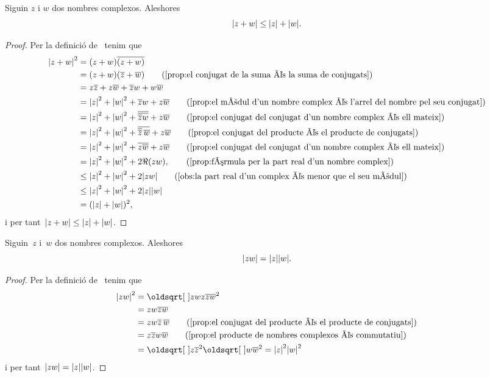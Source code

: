\documentclass[../Apunts.tex]{subfiles}
\begin{document}
	\begin{proposition}
		\label{prop:desigualta triangular nombres complexos}
		Siguin \(z\) i \(w\) dos nombres complexos. Aleshores
		\[\modul{z+w}\leq\modul{z}+\modul{w}.\]
	\end{proposition}
	\begin{proof}
		Per la definició de~ tenim que
		\begin{align*}
			\modul{z+w}^{2}&=(z+w)\conjugat{(z+w)} \\
			&=(z+w)(\conjugat{z}+\conjugat{w}) \tag{\ref{prop:el conjugat de la suma és la suma de conjugats}} \\
			&=z\conjugat{z}+z\conjugat{w}+\conjugat{z}w+w\conjugat{w} \\
			&=\modul{z}^{2}+\modul{w}^{2}+\conjugat{z}w+z\conjugat{w} \tag{\ref{prop:el mòdul d'un nombre complex és l'arrel del nombre pel seu conjugat}} \\
			&=\modul{z}^{2}+\modul{w}^{2}+\conjugat{\conjugat{\conjugat{z}w}}+z\conjugat{w} \tag{\ref{prop:el conjugat del conjugat d'un nombre complex és ell mateix}} \\
			&=\modul{z}^{2}+\modul{w}^{2}+\conjugat{\conjugat{\conjugat{z}}\,\conjugat{w}}+z\conjugat{w} \tag{\ref{prop:el conjugat del producte és el producte de conjugats}} \\
			&=\modul{z}^{2}+\modul{w}^{2}+\conjugat{z\conjugat{w}}+z\conjugat{w}\tag{\ref{prop:el conjugat del conjugat d'un nombre complex és ell mateix}} \\
			&=\modul{z}^{2}+\modul{w}^{2}+2\Re(zw), \tag{\ref{prop:fórmula per la part real d'un nombre complex}} \\
			&\leq\modul{z}^{2}+\modul{w}^{2}+2\modul{zw} \tag{\ref{obs:la part real d'un complex és menor que el seu mòdul}} \\
			&\leq\modul{z}^{2}+\modul{w}^{2}+2\modul{z}\modul{w} \\
			&=(\modul{z}+\modul{w})^{2},
		\end{align*}
		i per tant~\(\modul{z+w}\leq\modul{z}+\modul{w}\).
	\end{proof}
	\begin{proposition}
		\label{prop:el producte de mòduls és el mòdul del producte}
		Siguin~\(z\) i~\(w\) dos nombres complexos. Aleshores
		\[\modul{zw}=\modul{z}\modul{w}.\]
	\end{proposition}
	\begin{proof}
		Per la definició de~ tenim que
		\begin{align*}
			\modul{zw}^{2}&=\sqrt{zwz\conjugat{zw}}^{2} \\
			&=zw\conjugat{zw} \\
			&=zw\conjugat{z}\,\conjugat{w} \tag{\ref{prop:el conjugat del producte és el producte de conjugats}} \\
			&=z\conjugat{z}w\conjugat{w} \tag{\ref{prop:el producte de nombres complexos és commutatiu}} \\
			&=\sqrt{z\conjugat{z}}^{2}\sqrt{w\conjugat{w}}^{2}=\modul{z}^{2}\modul{w}^{2}
		\end{align*}
		i per tant~\(\modul{zw}=\modul{z}\modul{w}\).
	\end{proof}
\end{document}
